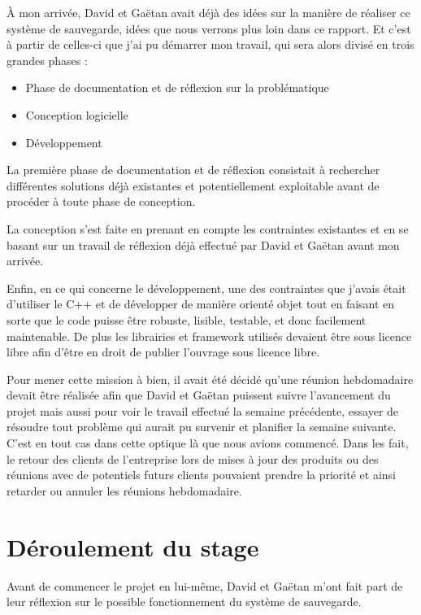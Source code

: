\documentclass[a4paper,10pt, twoside]{report}
\begin{document}
\begin{spacing}{1.2}
\`A mon arriv\'ee, David et Ga\"etan avait d\'ej\`a des id\'ees sur la
mani\`ere de r\'ealiser ce syst\`eme de sauvegarde, id\'ees que nous verrons
plus loin dans ce rapport. Et c'est \`a partir de celles-ci que j'ai pu
d\'emarrer mon travail, qui sera alors divis\'e en trois grandes phases :

\begin{itemize}
 \item Phase de documentation et de r\'eflexion sur la probl\'ematique
 \item Conception logicielle
 \item D\'eveloppement
\end{itemize}

La premi\`ere phase de documentation et de r\'eflexion consistait \`a
rechercher diff\'erentes solutions d\'ej\`a existantes et potentiellement
exploitable avant de proc\'eder \`a toute phase de conception.

La conception s'est faite en prenant en compte les contraintes existantes
et en se basant sur un travail de r\'eflexion d\'ej\`a effectu\'e par David et
Ga\"etan avant mon arriv\'ee.

Enfin, en ce qui concerne le d\'eveloppement, une des contraintes que j'avais
\'etait d'utiliser le C++ et de d\'evelopper de mani\`ere orient\'e objet tout
en faisant en sorte que le code puisse \^etre robuste, lisible, testable, et
donc facilement maintenable. De plus les librairies et framework utilis\'es
devaient \^etre sous licence libre afin d'\^etre en droit de publier l'ouvrage
sous licence libre.

Pour mener cette mission \`a bien, il avait \'et\'e d\'ecid\'e qu'une r\'eunion
hebdomadaire devait \^etre r\'ealis\'ee afin que David et Ga\"etan puissent
suivre l'avancement du projet mais aussi pour voir le travail effectu\'e la
semaine pr\'ec\'edente, essayer de r\'esoudre tout probl\`eme qui aurait pu
survenir et planifier la semaine suivante.
C'est en tout cas dans cette optique l\`a que nous avions commenc\'e. Dans les
fait, le retour des clients de l'entreprise lors de mises \`a jour des produits
ou des r\'eunions avec de potentiels futurs clients pouvaient prendre la
priorit\'e et ainsi retarder ou annuler les r\'eunions hebdomadaire.

\chapter{D\'eroulement du stage}
\thispagestyle{fancy}
Avant de commencer le projet en lui-m\^eme, David et Ga\"etan m'ont fait part
de leur r\'eflexion sur le possible fonctionnement du syst\`eme de sauvegarde.


\end{spacing}
\end{document}
